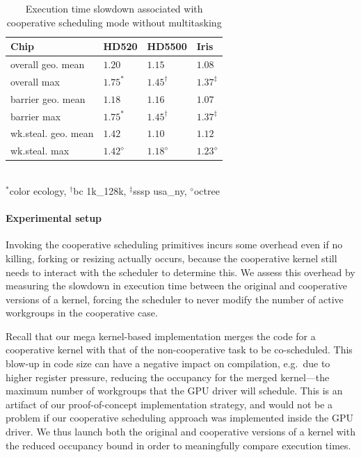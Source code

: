 \documentclass[numbers,nocopyrightspace,10pt]{sigplanconf}
\begin{document}
\begin{table}
\small
\centering
\begin{tabular}{ l l l l }
Chip & HD520 & HD5500 & Iris\\
\hline
overall geo. mean  & $1.20$ & $1.15$ & $1.08$ \\
overall max & $1.75^{\ast}$ & $1.45^{\dagger}$ & $1.37^{\ddagger}$ \\

\hline
barrier geo. mean & $1.18$ & $1.16$ & $1.07$ \\
barrier max & $1.75^{\ast}$ & $1.45^{\dagger}$ & $1.37^{\ddagger}$ \\

\hline
wk.steal. geo. mean & $1.42$ & $1.10$ & $1.12$ \\
wk.steal. max & $1.42^{\diamond}$ & $1.18^{\diamond}$ & $1.23^{\diamond}$ \\

\hline
\end{tabular}\\
{\footnotesize
$^{\ast}$color ecology, $^{\dagger}$bc 1k\_128k, $^{\ddagger}$sssp usa\_ny, $^{\diamond}$octree
}
\caption{Execution time slowdown associated with cooperative scheduling mode without multitasking}
\label{tab:overhead}
\end{table}

\paragraph{Experimental setup}
Invoking the cooperative scheduling primitives incurs some overhead
even if no killing, forking or resizing actually occurs, because the cooperative kernel still needs to interact with the scheduler to determine this.
We assess this overhead by measuring the
 slowdown in execution time between the original and cooperative versions of a kernel, forcing the scheduler to never modify the number of
active workgroups in the cooperative case.

Recall that our mega kernel-based implementation merges the code for a
cooperative kernel with that of the non-cooperative task to be
co-scheduled.  This blow-up in code size can have a negative impact on
compilation, e.g.\ due to higher register pressure, reducing the
occupancy for the merged kernel---the maximum number of workgroups
that the GPU driver will schedule.  This is an artifact of our
proof-of-concept implementation strategy, and would not be a problem
if our cooperative scheduling approach was implemented inside the GPU
driver.  We thus launch both the original and cooperative versions of
a kernel with the reduced occupancy bound in order to meaningfully
compare execution times.
\end{document}

